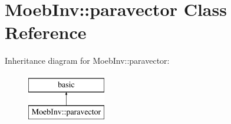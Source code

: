 \hypertarget{class_moeb_inv_1_1paravector}{}\section{Moeb\+Inv\+:\+:paravector Class Reference}
\label{class_moeb_inv_1_1paravector}
Inheritance diagram for Moeb\+Inv\+:\+:paravector\+:\begin{figure}[H]
\begin{center}
\leavevmode
\includegraphics[height=2.000000cm]{class_moeb_inv_1_1paravector}
\end{center}
\end{figure}
